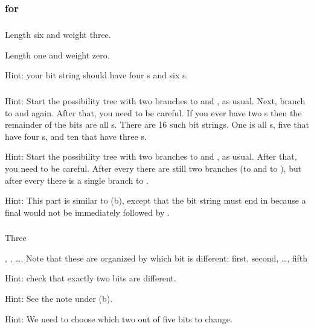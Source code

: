 \subsection{\answers}

\subsubsection{\answers for  \subbitstrings}

\subsubsection*{ \answers}
\begin{apart}
    \item Length six and weight three.
    \item Length one and weight zero.
    \item Hint: your bit string should have four s and six s.
\end{apart}

\subsubsection*{ \answers}
\begin{apart}
    \item Hint: Start the possibility tree with two branches to  and , as usual.  Next, branch to  and  again.  After that, you need to be careful. If you ever have two s then the remainder of the bits are all s.  There are 16 such bit strings. One is all s, five that have four s, and ten that have three s.
    \item Hint: Start the possibility tree with two branches to  and , as usual. After that, you need to be careful.  After every  there are still two branches (to  and to ), but after every  there is a single branch to .
    \item Hint: This part is similar to (b), except that the bit string must end in  because a final  would not be immediately followed by .
\end{apart}

\subsubsection*{ \answers}
\begin{apart}
    \item Three
    \item {}, , \ldots,  Note that these are organized by which bit is different: first, second, \ldots, fifth
    \item Hint: check that exactly two bits are different.
    \item Hint: See the note under (b).
    \item Hint: We need to choose which two out of five bits to change.  
\end{apart}

